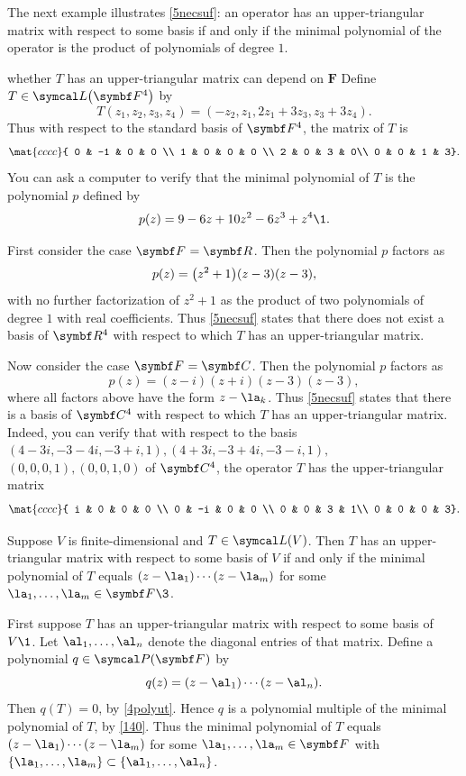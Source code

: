 The next example illustrates \ref{5necsuf}: an operator has an upper-triangular matrix with respect to some basis if and only if the minimal polynomial of the operator is the product of polynomials of degree $1$.

\begin{example}{whether\/ $T$ has an upper-triangular matrix can depend on\/ $\symbf{F}$}
Define $T \in \L\paren[\big]{\F4}$ by
\[
T(z_1, z_2, z_3, z_4) = (-z_2, z_1, 2 z_1 + 3z_3, z_3+3z_4).
\]
Thus with respect to the standard basis of $\F4$, the matrix of $T$ is
\[
\mat{cccc}{
0 & -1 & 0 & 0 \\
1 & 0 & 0 & 0 \\
2 & 0 & 3 & 0\\
0 & 0 & 1 & 3}.
\]
You can ask a computer to verify that the minimal polynomial of $T$ is the polynomial $p$ defined by
\[
p(z) = 9 - 6z + 10 z^2 -6z^3 + z^4\1.
\]

First consider the case $\F{} = \R{}$. Then the polynomial $p$ factors as
\[
p(z) = \paren[\big]{z^2 + 1} (z-3)(z-3),
\]
with no further factorization of $z^2 + 1$ as the product of two polynomials of degree $1$ with real coefficients. Thus \ref{5necsuf} states that there does not exist a basis of $\R4$ with respect to which $T$ has an upper-triangular matrix.

Now consider the case $\F{} = \C{}$. Then the polynomial $p$ factors as
\[
p(z) = (z-i)(z+i)(z-3)(z-3),
\]
where all factors above have the form $z - \la_k$. Thus \ref{5necsuf} states that there is a basis of $\C4$ with respect to which $T$ has an upper-triangular matrix. Indeed, you can verify that with respect to the basis $(4-3i, -3-4i,-3+i,1), (4+3i,-3+4i,-3-i,1),$ $(0, 0, 0, 1), (0,0,1, 0)$ of $\C4$, the operator $T$ has the upper-triangular matrix
\[
\mat{cccc}{
i & 0 & 0 & 0 \\
0 & -i & 0 & 0 \\
0 & 0 & 3 & 1\\
0 & 0 & 0 & 3}.
\]
\end{example}

{Suppose $V$ is finite-dimensional and $T \in \L(V)$. Then $T$ has an upper-triangular matrix with respect to some basis of $V$ if and only if the minimal polynomial of $T$ equals $(z-\la_1) \cdots (z-\la_m)$ for some $\la_1, \ldots, \la_m \in \F{}\3$.}

\proof
First suppose $T$ has an upper-triangular matrix with respect to some basis of $V\1$. Let $\al_1, \ldots, \al_n$ denote the diagonal entries of that matrix. Define a polynomial $q \in \P(\F{})$ by
\[
q(z) = (z-\al_1) \cdots (z-\al_n).
\]
Then $q(T) = 0$, by \ref{4polyut}. Hence $q$ is a polynomial multiple of the minimal polynomial of $T$, by \ref{140}. Thus the minimal polynomial of $T$ equals $(z-\la_1) \cdots (z-\la_m)$ for some $\la_1, \ldots, \la_m \in \F{}$ with
$\br{\la_1, \ldots, \la_m} \subset \br{\al_1, \ldots, \al_n}$.

